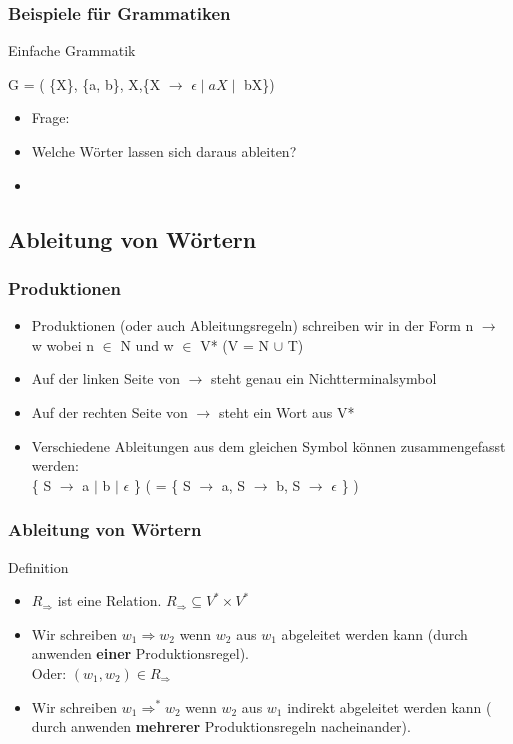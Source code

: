 \documentclass{beamer}
\begin{document}
\begin{frame}
	\frametitle{Beispiele f\"ur Grammatiken}
	\begin{block}{Einfache Grammatik}
		\begin{center}
			G = ( \{X\}, \{a, b\}, X,\{X $\rightarrow$ 
			$\epsilon \mid aX \mid$ bX\})
		\end{center}
		\pause
		\begin{itemize}
			\item Frage: \\
			\item Welche W\"orter lassen sich daraus 						ableiten? \\
			\item {}
		\end{itemize}
	\end{block}
\end{frame}

\subsection{Ableitung von Wörtern}
\begin{frame}
	\frametitle{Produktionen}
	\begin{itemize}
		\item Produktionen (oder auch Ableitungsregeln) 				schreiben wir in der Form n $\rightarrow$ w wobei n 
		$\in$ N und w $\in$ V* (V = N $\cup$ T)
		\item Auf der linken Seite von $\rightarrow$ steht 				genau ein Nichtterminalsymbol
		\item Auf der rechten Seite von $\rightarrow$ steht 			ein Wort aus V*
		\item Verschiedene Ableitungen aus dem gleichen 				Symbol können zusammengefasst werden: \\
		\{ S $\rightarrow$ a $\mid$ b $\mid$ $\epsilon$ \} ( 			= \{ S $\rightarrow$ a, S $\rightarrow$ b, S 
		$\rightarrow$ $\epsilon$ \} )
	\end{itemize}
\end{frame}

\begin{frame}
	\frametitle{Ableitung von W\"ortern}
	\begin{block} {Definition }
		\begin{itemize}
			\item $R_\Rightarrow$ ist eine Relation. $R_\Rightarrow\subseteq V^* \times V^*$
			\item Wir schreiben $w_1 \Rightarrow w_2$ wenn $w_2$ aus $w_1$ abgeleitet werden kann (durch anwenden 								\textbf{einer} Produktionsregel). \\
			Oder: $(w_1, w_2) \in R_\Rightarrow$
			\item Wir schreiben $w_1 \Rightarrow^* w_2$ wenn 					$w_2$ aus $w_1$ indirekt abgeleitet werden kann ( 					durch anwenden \textbf{mehrerer} Produktionsregeln 					nacheinander).
		\end{itemize}
	\end{block}
\end{frame}
\end{document}
